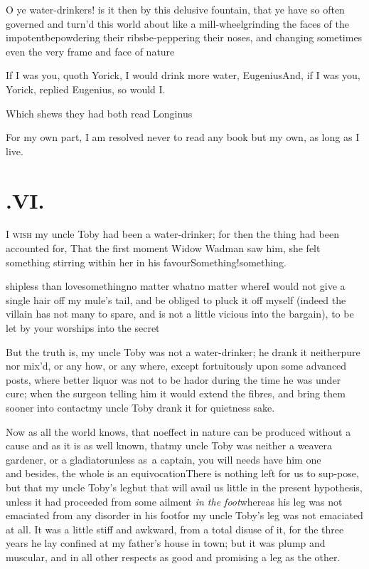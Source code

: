 \documentclass{article}
\begin{document}
O ye water-drinkers! is it then by this delusive fountain, that
ye have so often governed and turn’d this world about like a mill-wheel\tsk grinding the faces of the
impotent\tsk bepowdering their ribs\tsk be-peppering their
noses, and changing sometimes even the very frame and face of
nature\tsh

\newpage
If I was you, quoth Yorick, I would drink more water,
Eugenius\tsk And, if I was you, Yorick, replied
Eugenius, so would I.

Which shews they had both read Longinus\tsh

For my own part, I am resolved never to read any book but my
own, as long as I live.

\newpage
\section{.\enspace VI.}

\lettrine{I}{ wish} my uncle Toby had been
a water-drinker; for then the thing had been accounted for, That
the first moment Widow Wadman saw him, she felt something
stirring within her in his
favour\tsk Something!\tsk something.

\noindent
{}
ship\tsk less than
love\tsk some\-thing\tsk no matter what\tsk no matter
where\tsk I would not give a single hair off my mule’s tail, and
be obliged to pluck it off myself (indeed the villain has not many
to spare, and is not a little vicious into the bargain), to be let
by your worships into the secret\tsh

\newpage
But the truth is, my uncle Toby was not a water-drinker;
he drank it neither\break pure nor mix’d, or any how, or any where,
except fortuitously upon some advanced posts, where better liquor
was not to be had\tsh or during the time he was under
cure; when the surgeon telling him it would extend the fibres, and
bring them sooner into contact\tsh my uncle Toby
drank it for quietness sake.

Now as all the world knows, that no\break effect in nature can be
produced without a cause and as it is as well known, that\break my uncle
Toby was neither a weaver\tsk\break a gardener, or a
gladiator\tsk unless as~a captain, you will needs have him
one\tsk\break
{}\\
and besides,
the whole is an equivocation\break\tsh There is nothing left for
us to sup-\pb pose, but that my uncle Toby’s
leg\tsh but that will avail us little in the present
hypothesis, unless it had proceeded from some ailment \textit{in the
foot}\tsk whereas his leg was not emaciated from any disorder
in his foot\tsk for my uncle Toby’s leg was not
emaciated at all. It was a little stiff and awkward, from a total
disuse of it, for the three years he lay confined at my
father’s house in town; but it was plump and muscular, and in
all other respects as good and promising a leg as the other.
\end{document}

